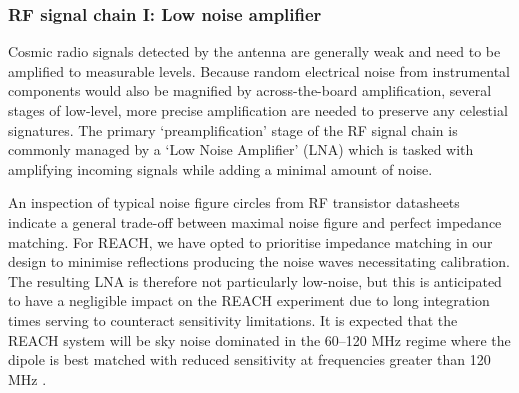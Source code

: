 \subsubsection{RF signal chain I: Low noise amplifier}
Cosmic radio signals detected by the antenna are generally weak and need to be amplified to measurable levels. Because random electrical noise from instrumental components would also be magnified by across-the-board amplification, several stages of low-level, more precise amplification are needed to preserve any celestial signatures. The primary ‘preamplification’ stage of the RF signal chain is commonly managed by a ‘Low Noise Amplifier’ (LNA) which is tasked with amplifying incoming signals while adding a minimal amount of noise. 

An inspection of typical noise figure circles from RF transistor datasheets indicate a general trade-off between maximal noise figure and perfect impedance matching. For REACH, we have opted to prioritise impedance matching in our design to minimise reflections producing the noise waves necessitating calibration. The resulting LNA is therefore not particularly low-noise, but this is anticipated to have a negligible impact on the REACH experiment due to long integration times serving to counteract sensitivity limitations. It is expected that the REACH system will be sky noise dominated in the 60--120 MHz regime where the dipole is best matched with reduced sensitivity at frequencies greater than 120 MHz \citep{nimaCal}.

